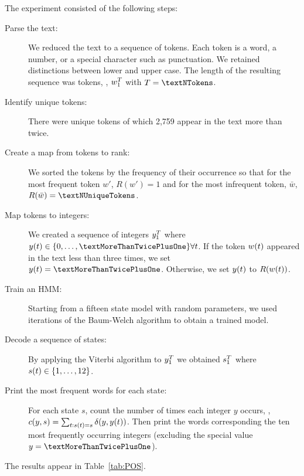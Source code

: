 The experiment consisted of the following steps:
\begin{description}
\item[Parse the text:] We reduced the text to a sequence of tokens.
  Each token is a word, a number, or a special character such as
  punctuation.  We retained distinctions between lower and upper case.
  The length of the resulting sequence was \textNTokens tokens, \ie,
  $w_{1}^{T}$ with $T=\textNTokens$.
\item[Identify unique tokens:] There were \textNUniqueTokens unique tokens of which
  2,759 appear in the text more than twice.
\item[Create a map from tokens to rank:] We sorted the tokens by the
  frequency of their occurrence so that for the most frequent token
  $w'$, $R(w')=1$ and for the most infrequent token, $\bar w$, $R(\bar
  w)=\textNUniqueTokens$.
\item[Map tokens to integers:] We created a sequence of integers
  $y_{1}^{T}$ where $\ti{y}{t} \in \{0,\ldots,\textMoreThanTwicePlusOne\} \forall
  t$.  If the token ${w}{(t)}$ appeared in the text less than three
  times, we set $\ti{y}{t}=\textMoreThanTwicePlusOne$.  Otherwise, we set  ${y}{(t)}$ to
  $R({w}{(t)})$.
\item[Train an HMM:] Starting from a fifteen state model with random
  parameters, we used \textTrainingIterations iterations of the
  Baum-Welch algorithm to obtain a trained model.
\item[Decode a sequence of states:] By applying the Viterbi algorithm
  to $y_{1}^{T}$ we obtained $s_{1}^{T}$ where ${s}{(t)}\in
  \{1,\ldots,12\}$.
\item[Print the most frequent words for each state:] For each state
  $s$, count the number of times each integer $y$ occurs, \ie, $c(y,s)
  = \sum_{t:{s}{(t)}=s} \delta(y,{y}{(t)})$.  Then print the words
  corresponding the ten most frequently occurring integers (excluding
  the special value $y=\textMoreThanTwicePlusOne$).
\end{description}
The results appear in Table~\ref{tab:POS}.

